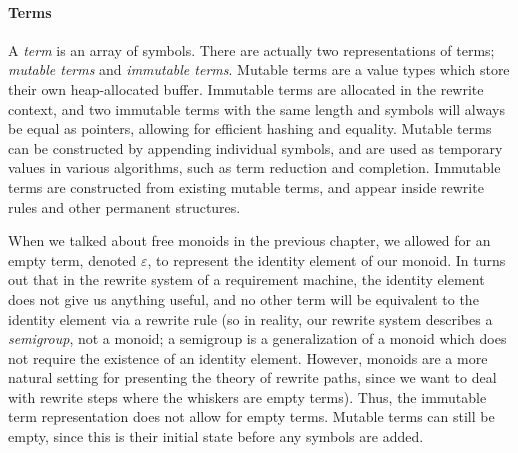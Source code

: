 \documentclass[../generics]{subfiles}
\begin{document}
\paragraph{Terms}
%
%
%
A \emph{term} is an array of symbols. There are actually two representations of terms; \emph{mutable terms} and \emph{immutable terms}. Mutable terms are a value types which store their own heap-allocated buffer. Immutable terms are allocated in the rewrite context, and two immutable terms with the same length and symbols will always be equal as pointers, allowing for efficient hashing and equality. Mutable terms can be constructed by appending individual symbols, and are used as temporary values in various algorithms, such as term reduction and completion. Immutable terms are constructed from existing mutable terms, and appear inside rewrite rules and other permanent structures.

%
%
%
When we talked about free monoids in the previous chapter, we allowed for an empty term, denoted $\varepsilon$, to represent the identity element of our monoid. In turns out that in the rewrite system of a requirement machine, the identity element does not give us anything useful, and no other term will be equivalent to the identity element via a rewrite rule (so in reality, our rewrite system describes a \emph{semigroup}, not a monoid; a semigroup is a generalization of a monoid which does not require the existence of an identity element. However, monoids are a more natural setting for presenting the theory of rewrite paths, since we want to deal with rewrite steps where the whiskers are empty terms). Thus, the immutable term representation does not allow for empty terms. Mutable terms can still be empty, since this is their initial state before any symbols are added.
\end{document}
